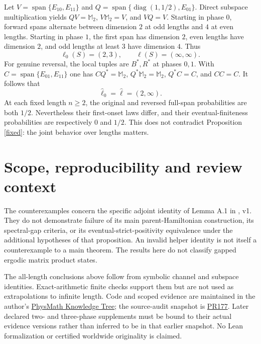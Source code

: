 \documentclass[11pt,a4paper]{article}
\newcommand{\Span}{\operatorname{span}}
\begin{document}
Let $V=\Span\{E_{10},E_{11}\}$ and
$Q=\Span\{\operatorname{diag}(1,1/2),E_{01}\}$. Direct subspace multiplication yields
$QV=\mathbb M_2$, $V\mathbb M_2=V$, and $VQ=V$.
Starting in phase $0$, forward spans alternate between dimension $2$ at odd lengths and $4$ at even lengths. Starting in phase $1$, the first span has dimension $2$, even lengths have dimension $2$, and odd lengths at least $3$ have dimension $4$. Thus
\[
 \ell_0(S)=(2,3),\qquad \ell(S)=(\infty,\infty).
\]
For genuine reversal, the local tuples are $B^*,R^*$ at phases $0,1$. With $C=\Span\{E_{01},E_{11}\}$ one has $CQ^*=\mathbb M_2$, $Q^*\mathbb M_2=\mathbb M_2$, $Q^*C=C$, and $CC=C$. It follows that
\[
 \widehat\ell_0=\widehat\ell=(2,\infty).
\]
At each fixed length $n\geq2$, the original and reversed full-span probabilities are both $1/2$. Nevertheless their first-onset laws differ, and their eventual-finiteness probabilities are respectively $0$ and $1/2$. This does not contradict Proposition \ref{fixed}: the joint behavior over lengths matters.

\section{Scope, reproducibility and review context}
The counterexamples concern the specific adjoint identity of Lemma A.1 in \cite{EMPS}, v1. They do not demonstrate failure of its main parent-Hamiltonian construction, its spectral-gap criteria, or its eventual-strict-positivity equivalence under the additional hypotheses of that proposition. An invalid helper identity is not itself a counterexample to a main theorem. The results here do not classify gapped ergodic matrix product states.

The all-length conclusions above follow from symbolic channel and subspace identities. Exact-arithmetic finite checks support them but are not used as extrapolations to infinite length. Code and scoped evidence are maintained in the author's \href{https://github.com/lluiseriksson/physmath-knowledge-tree}{PhysMath Knowledge Tree}; the source-audit snapshot is \href{https://github.com/lluiseriksson/physmath-knowledge-tree/pull/177}{PR177}. Later declared two- and three-phase supplements must be bound to their actual evidence versions rather than inferred to be in that earlier snapshot. No Lean formalization or certified worldwide originality is claimed.
\end{document}
